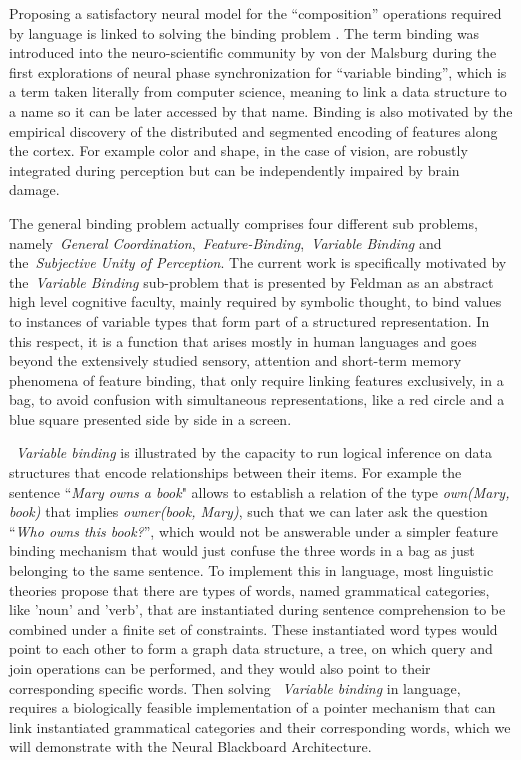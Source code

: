 \documentclass[10pt]{article}
\begin{document}
Proposing a satisfactory neural model for the ``composition'' operations required by language is linked to solving the binding problem \cite{marcus14}.
The term binding was introduced into the neuro-scientific community by von der Malsburg\cite{von_der_Malsburg_1994} during the first explorations of neural phase synchronization for ``variable binding'', which is a term taken literally from computer science, meaning to link a data structure to a name so it can be later accessed by that name.
Binding is also motivated by the empirical discovery of the distributed and segmented encoding of features along the cortex. For example color and shape, in the case of vision, are robustly integrated during perception but can be independently impaired by brain damage.

The general binding problem actually comprises four different sub problems, namely~\emph{General Coordination},~\emph{Feature-Binding},~\emph{Variable Binding} and the~\emph{Subjective Unity of Perception}\cite{Feldman_2012}.
The current work is specifically motivated by the~\emph{Variable Binding} sub-problem that is presented by Feldman as an abstract high level cognitive faculty, mainly required by symbolic thought, to bind values to instances of variable types that form part of a structured representation.
In this respect, it is a function that arises mostly in human languages and goes beyond the extensively studied sensory, attention and short-term memory phenomena of feature binding, that only require linking features exclusively, in a bag, to avoid confusion with simultaneous representations, like a red circle and a blue square presented side by side in a screen.

~\emph{Variable binding} is illustrated by the capacity to run logical inference on data structures that encode relationships between their items.
For example the sentence ``\emph{Mary owns a book}" allows to establish a relation of the type \emph{own(Mary, book)} that implies \emph{owner(book, Mary)}, such that we can later ask the question ``\emph{Who owns this book?}'', which would not be answerable under a simpler feature binding mechanism that would just confuse the three words in a bag as just belonging to the same sentence.
To implement this in language, most linguistic theories propose that there are types of words, named grammatical categories, like 'noun' and 'verb', that are instantiated during sentence comprehension to be combined under a finite set of constraints.
These instantiated word types would point to each other to form a graph data structure, a tree, on which query and join operations can be performed, and they would also point to their corresponding specific words.
Then solving ~\emph{Variable binding} in language, requires a biologically feasible implementation of a pointer mechanism that can link instantiated grammatical categories and their corresponding words, which we will demonstrate with the Neural Blackboard Architecture.
\end{document}
